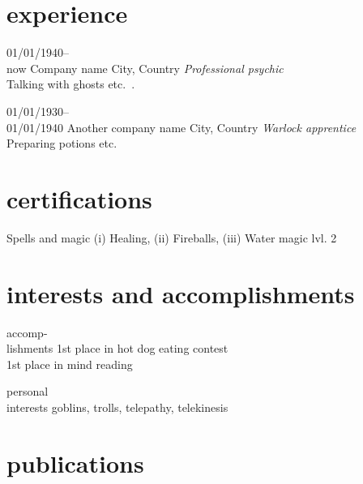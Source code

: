 \documentclass[]{friggeri-cv} %
\begin{document}
\section{experience}

\begin{entrylist}
\entry
{01/01/1940--\\now}
{Company name}
{City, Country}
{\emph{Professional psychic}\\
Talking with ghosts etc.~\cite{example}.
}

\entry
{01/01/1930--\\01/01/1940}
{Another company name}
{City, Country}
{\emph{Warlock apprentice}\\
Preparing potions etc.
}

\end{entrylist}


\section{certifications}
\begin{entrylist}
\entry
{}
{Spells and magic}
{}
{(i) Healing, (ii) Fireballs, (iii) Water magic lvl. 2}

\end{entrylist}


\section{interests and accomplishments}

\begin{entrylist}

\entry
{accomp-\\lishments}
{1st place in hot dog eating contest\\ 
1st place in mind reading}
{}
{}

\entry
{personal\\interests}
{goblins, trolls, telepathy, telekinesis}
{}
{}

\end{entrylist}


\section{publications}


\nocite{*}
\printbibliography[heading=none,sorting=chronological]
\end{document}
